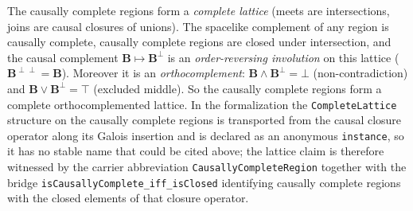 \begin{theorem}
    \label{thrm:causally-complete-lattice}
    \leanok
    The causally complete regions form a \emph{complete lattice} (meets are intersections, joins are causal closures of unions). The spacelike complement of any region is causally complete, causally complete regions are closed under intersection, and the causal complement $\mathbf{B} \mapsto \mathbf{B}^\perp$ is an \emph{order-reversing involution} on this lattice ($\mathbf{B}^{\perp\perp} = \mathbf{B}$). Moreover it is an \emph{orthocomplement}: $\mathbf{B} \wedge \mathbf{B}^\perp = \bot$ (non-contradiction) and $\mathbf{B} \vee \mathbf{B}^\perp = \top$ (excluded middle). So the causally complete regions form a complete orthocomplemented lattice. In the formalization the \texttt{CompleteLattice} structure on the causally complete regions is transported from the causal closure operator along its Galois insertion and is declared as an anonymous \texttt{instance}, so it has no stable name that could be cited above; the lattice claim is therefore witnessed by the carrier abbreviation \texttt{CausallyCompleteRegion} together with the bridge \texttt{isCausallyComplete\_iff\_isClosed} identifying causally complete regions with the closed elements of that closure operator.
\end{theorem}

